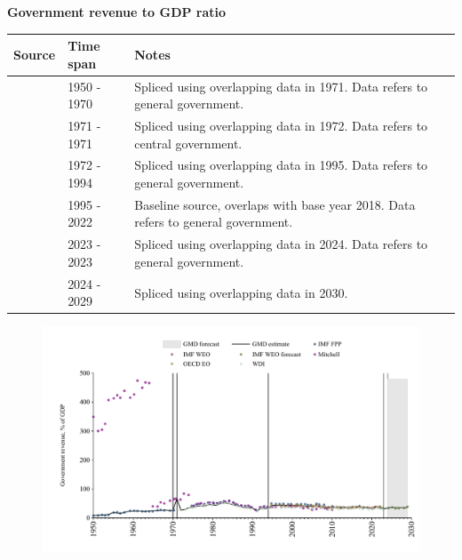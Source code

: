 \documentclass[12pt,a4paper,landscape]{article}
\begin{document}
\begin{adjustbox}{max totalsize={\paperwidth}{\paperheight},center}
\begin{minipage}[t][\textheight][t]{\textwidth}
\vspace*{0.5cm}
{}
\begin{center}
{\Large\bfseries Government revenue to GDP ratio}
\end{center}
\vspace{0.5cm}
\begin{table}[H]
\centering
\small
\begin{tabular}{|l|l|l|}
\hline
\textbf{Source} & \textbf{Time span} & \textbf{Notes} \\
\hline
\rowcolor{white}\cite{IMF_FPP}& 1950 - 1970 &Spliced using overlapping data in 1971. Data refers to general government.\\
\rowcolor{lightgray}\cite{Mitchell}& 1971 - 1971 &Spliced using overlapping data in 1972. Data refers to central government.\\
\rowcolor{white}\cite{WDI}& 1972 - 1994 &Spliced using overlapping data in 1995. Data refers to general government.\\
\rowcolor{lightgray}\cite{OECD_EO}& 1995 - 2022 &Baseline source, overlaps with base year 2018. Data refers to general government.\\
\rowcolor{white}\cite{WDI}& 2023 - 2023 &Spliced using overlapping data in 2024. Data refers to general government.\\
\rowcolor{lightgray}\cite{IMF_WEO_forecast}& 2024 - 2029 &Spliced using overlapping data in 2030. \\
\hline
\end{tabular}
\end{table}
\begin{figure}[H]
\centering
\includegraphics[width=\textwidth,height=0.6\textheight,keepaspectratio]{graphs/ISR_govrev_GDP.pdf}
\end{figure}
\end{minipage}
\end{adjustbox}
\end{document}
